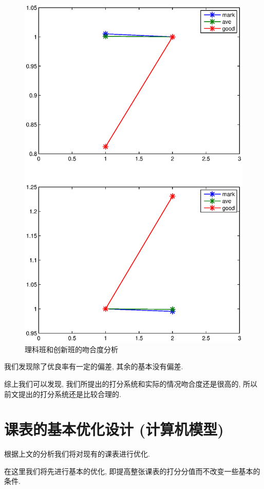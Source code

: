 \documentclass[a4paper]{article}
\begin{document}
  \begin{figure}[H]
  \centerline{\includegraphics[scale=0.4]{coincideinno.eps}}
  \caption{理科班和创新班的吻合度分析}
  \end{figure}
  我们发现除了优良率有一定的偏差, 其余的基本没有偏差.\par
  综上我们可以发现, 我们所提出的打分系统和实际的情况吻合度还是很高的, 所以前文提出的打分系统还是比较合理的.
\clearpage
\section{课表的基本优化设计 (计算机模型)}
 根据上文的分析我们将对现有的课表进行优化.\par
 在这里我们将先进行基本的优化, 即提高整张课表的打分分值而不改变一些基本的条件.
\end{document}
